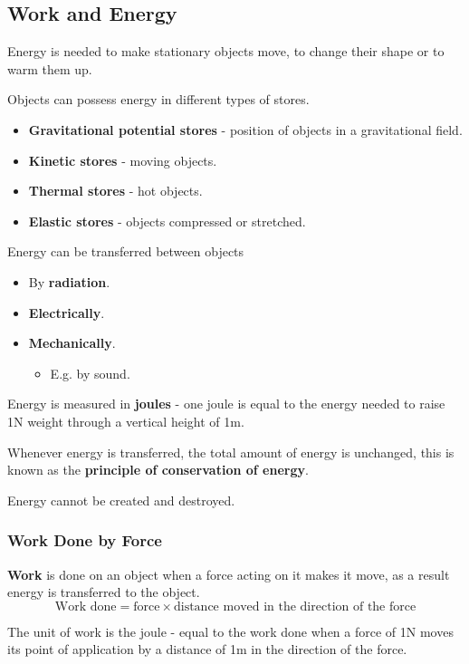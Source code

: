 \subsection{Work and Energy}

Energy is needed to make stationary objects move, to change their shape or to warm them up.

Objects can possess energy in different types of stores.
\begin{itemize}
    \item \textbf{Gravitational potential stores} - position of objects in a gravitational field.
    \item \textbf{Kinetic stores} - moving objects.
    \item \textbf{Thermal stores} - hot objects.
    \item \textbf{Elastic stores} - objects compressed or stretched.
\end{itemize}

Energy can be transferred between objects
\begin{itemize}
    \item By \textbf{radiation}.
    \item \textbf{Electrically}.
    \item \textbf{Mechanically}.
        \begin{itemize}
            \item E.g. by sound.
        \end{itemize}
\end{itemize}

Energy is measured in \textbf{joules} - one joule is equal to the energy needed to raise 1N weight through a vertical height of 1m.

Whenever energy is transferred, the total amount of energy is unchanged, this is known as the \textbf{principle of conservation of energy}.

Energy cannot be created and destroyed.

\subsubsection*{Work Done by Force}

\textbf{Work} is done on an object when a force acting on it makes it move, as a result energy is transferred to the object.
$$\text{Work done}=\text{force}\times\text{distance moved in the direction of the force}$$

The unit of work is the joule - equal to the work done when a force of 1N moves its point of application by a distance of 1m in the direction of the force.

